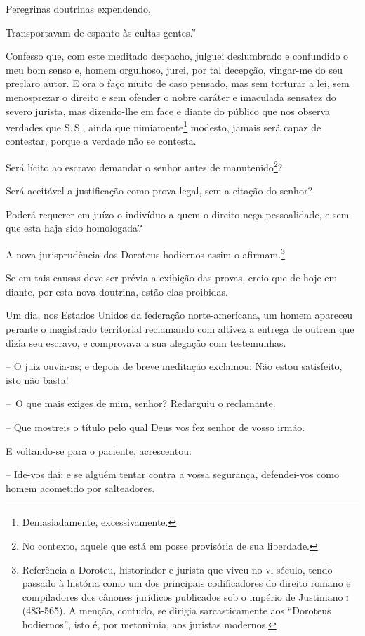 Peregrinas doutrinas expendendo,

Transportavam de espanto às cultas gentes.''

Confesso que, com este meditado despacho, julguei deslumbrado e
confundido o meu bom senso e, homem orgulhoso, jurei, por tal decepção,
vingar-me do seu preclaro autor. E ora o faço muito de caso pensado, mas
sem torturar a lei, sem menosprezar o direito e sem ofender o nobre
caráter e imaculada sensatez do severo jurista, mas dizendo-lhe em face
e diante do público que nos observa verdades que S.\,S., ainda que
nimiamente\footnote{Demasiadamente, excessivamente.} modesto, jamais
será capaz de contestar, porque a verdade não se contesta.

Será lícito ao escravo demandar o senhor antes de manutenido\footnote{
  No contexto, aquele que está em posse provisória de sua liberdade.}?

Será aceitável a justificação como prova legal, sem a citação do senhor?

Poderá requerer em juízo o indivíduo a quem o direito nega pessoalidade,
e sem que esta haja sido homologada?

A nova jurisprudência dos Doroteus hodiernos assim o afirmam.\footnote{
  Referência a Doroteu, historiador e jurista que viveu no \textsc{vi} século,
  tendo passado à história como um dos principais codificadores do
  direito romano e compiladores dos cânones jurídicos publicados sob o
  império de Justiniano \textsc{i} (483-565). A menção, contudo, se dirigia
  sarcasticamente aos ``Doroteus hodiernos'', isto é, por metonímia, aos
  juristas modernos.\label{doroteu}}

Se em tais causas deve ser prévia a exibição das provas, creio que de
hoje em diante, por esta nova doutrina, estão elas proibidas.

Um dia, nos Estados Unidos da federação norte-americana, um homem
apareceu perante o magistrado territorial reclamando com altivez a
entrega de outrem que dizia seu escravo, e comprovava a sua alegação com
testemunhas.

-- O juiz ouvia-as; e depois de breve meditação exclamou: Não estou
satisfeito, isto não basta!

--~O que mais exiges de mim, senhor? Redarguiu o reclamante.

-- Que mostreis o título pelo qual Deus vos fez senhor de vosso irmão.

E voltando-se para o paciente, acrescentou:

-- Ide-vos daí: e se alguém tentar contra a vossa segurança,
defendei-vos como homem acometido por salteadores.

